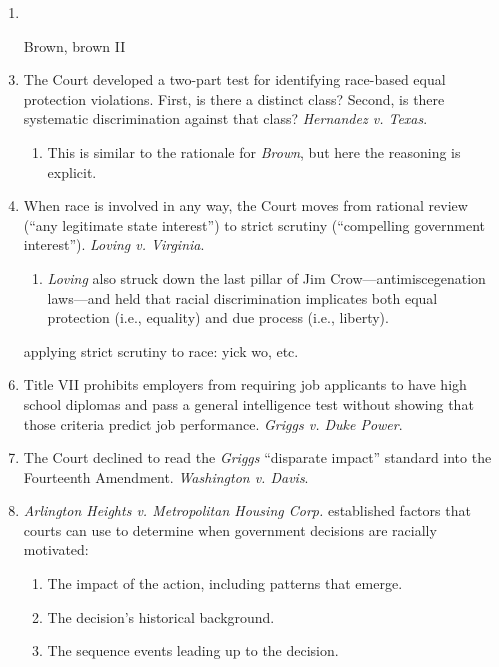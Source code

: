\begin{enumerate}
    \item %
    \item [Brown, brown II] %
    \item The Court developed a two-part test for identifying race-based equal 
    protection violations. First, is there a distinct class? Second, is there 
    systematic discrimination against that class? \emph{Hernandez v. Texas}.
    \begin{enumerate}
        \item This is similar to the rationale for \emph{Brown}, but here the 
        reasoning is explicit.
    \end{enumerate}
    \item When race is involved in any way, the Court moves from rational 
    review (``any legitimate state interest'') to strict scrutiny 
    (``compelling government interest''). \emph{Loving v. Virginia}.
    \begin{enumerate}
        \item \emph{Loving} also struck down the last pillar of Jim 
        Crow---antimiscegenation laws---and held that racial discrimination 
        implicates both equal protection (i.e., equality) and due process 
        (i.e., liberty).
    \end{enumerate}
    \item [applying strict scrutiny to race: yick wo, etc.] %
    \item Title VII prohibits employers from requiring job applicants to have 
    high school diplomas and pass a general intelligence test without showing 
    that those criteria predict job performance. \emph{Griggs v. Duke Power}.
    \item The Court declined to read the \emph{Griggs} ``disparate impact'' 
    standard into the Fourteenth Amendment. \emph{Washington v. Davis}.
    \item \emph{Arlington Heights v. Metropolitan Housing Corp.} established 
    factors that courts can use to determine when government decisions are 
    racially motivated:
    \begin{enumerate}
        \item The impact of the action, including patterns that emerge.
        \item The decision's historical background.
        \item The sequence events leading up to the decision.

\end{enumerate}
\end{enumerate}
